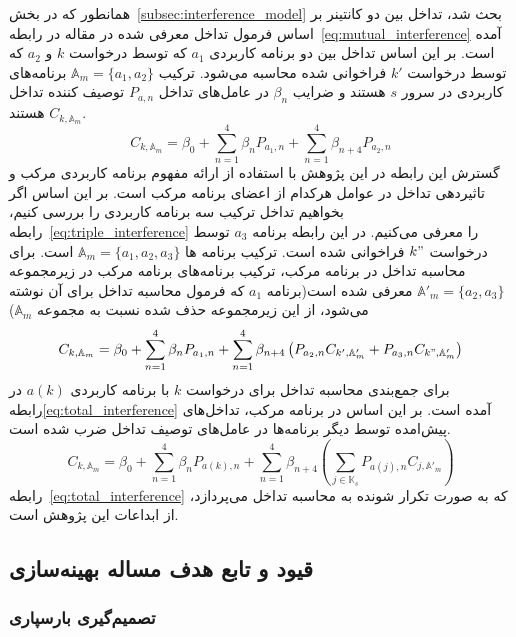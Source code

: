 همانطور که در بخش~\ref{subsec:interference_model} بحث شد، تداخل بین دو کانتینر بر اساس فرمول تداخل معرفی شده در مقاله \cite{medel2023modeling} در رابطه~\eqref{eq:mutual_interference} آمده است. بر این اساس تداخل بین دو برنامه کاربردی $a_1$ که توسط درخواست $k$ و $a_2$ که توسط درخواست $k'$ فراخوانی شده محاسبه می‌شود. ترکیب $\mathbb{A}_m=\{a_1,a_2\}$ برنامه‌های کاربردی در سرور $s$ هستند و ضرایب $\beta_n$ در عامل‌های تداخل $P_{a,n}$ توصیف کننده تداخل $C_{k,\mathbb{A}_m}$ هستند.
\begin{equation} \label{eq:mutual_interference}
    C_{k,\mathbb{A}_m} = \beta_0 + \sum_{n=1}^4 \beta_n P_{a_1,n} + \sum_{n=1}^4 \beta_{n+4} P_{a_2,n}
\end{equation}
گسترش این رابطه در این پژوهش با استفاده از ارائه مفهوم برنامه کاربردی مرکب و تاثیردهی تداخل در عوامل هرکدام از اعضای برنامه مرکب است. بر این اساس اگر بخواهیم تداخل ترکیب سه برنامه کاربردی را بررسی کنیم، رابطه~\eqref{eq:triple_interference} را معرفی می‌کنیم. در این رابطه برنامه $a_3$ توسط درخواست $k"$ فراخوانی شده است. ترکیب برنامه ها $\mathbb{A}_m=\{a_1,a_2,a_3\}$ است. برای محاسبه تداخل در برنامه مرکب، ترکیب برنامه‌های برنامه مرکب در زیرمجموعه $\mathbb{A}'_m=\{a_2,a_3\}$ معرفی شده است(برنامه $a_1$ که فرمول محاسبه تداخل برای آن نوشته می‌شود، از این زیرمجموعه حذف شده نسبت به مجموعه $\mathbb{A}_m$)
\begin{equation} \label{eq:triple_interference}
    C_{k,\mathbb{A}_m} = \beta_0 + \sum_{n=1}^4 \beta_n P_{a_1,n} + \sum_{n=1}^4 \beta_{n+4} \left(P_{a_2,n}C_{k',\mathbb{A}'_m} + P_{a_3,n}C_{k",\mathbb{A}'_m}\right)
\end{equation}
برای جمع‌بندی محاسبه تداخل برای درخواست $k$ با برنامه کاربردی $a(k)$ در رابطه\eqref{eq:total_interference} آمده است. بر این اساس در برنامه مرکب، تداخل‌های پیش‌امده توسط دیگر برنامه‌ها در عامل‌های توصیف تداخل ضرب شده است.
\begin{equation} \label{eq:total_interference}
    C_{k,\mathbb{A}_m} = \beta_0 + \sum_{n=1}^4 \beta_n P_{a(k),n} + \sum_{n=1}^4 \beta_{n+4} \left(\sum_{j \in \mathbb{K}_s} P_{a(j),n} C_{j,\mathbb{A}'_m}\right)
\end{equation}
رابطه~\eqref{eq:total_interference} که به صورت تکرار شونده به محاسبه تداخل می‌پردازد، از ابداعات این پژوهش است.

\subsection{قیود و تابع هدف مساله بهینه‌سازی}

\subsubsection{تصمیم‌گیری بارسپاری} \label{subsubsec:off_decision}

